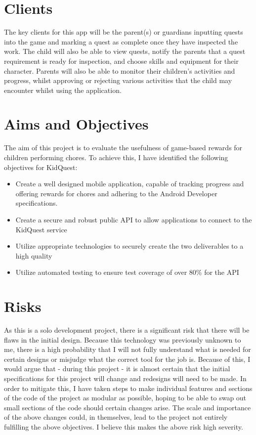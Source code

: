 \section{Clients}
The key clients for this app will be the parent(s) or guardians inputting quests into the game and marking a quest as complete once they have inspected the work. 
The child will also be able to view quests, notify the parents that a quest requirement is ready for inspection, and choose skills and equipment for their character.
Parents will also be able to monitor their children's activities and progress, whilst approving or rejecting various activities that the child may encounter whilst using the application. 

\section{Aims and Objectives}
The aim of this project is to evaluate the usefulness of game-based rewards for children performing chores. 
To achieve this, I have identified the following objectives for KidQuest:

\begin{itemize}
	\item Create a well designed mobile application, capable of tracking progress and offering rewards for chores and adhering to the Android Developer specifications.
	\item Create a secure and robust public API to allow applications to connect to the KidQuest service
	\item Utilize appropriate technologies to securely create the two deliverables to a high quality
	\item Utilize automated testing to ensure test coverage of over 80\% for the API
\end{itemize}

\section{Risks}
As this is a solo development project, there is a significant risk that there will be flaws in the initial design. 
Because this technology was previously unknown to me, there is a high probability that I will not fully understand what is needed for certain designs or misjudge what the correct tool for the job is.
Because of this, I would argue that - during this project - it is almost certain that the initial specifications for this project will change and redesigns will need to be made.
In order to mitigate this, I have taken steps to make individual features and sections of the code of the project as modular as possible, hoping to be able to swap out small sections of the code should certain changes arise.
The scale and importance of the above changes could, in themselves, lead to the project not entirely fulfilling the above objectives. I believe this makes the above risk high severity.

